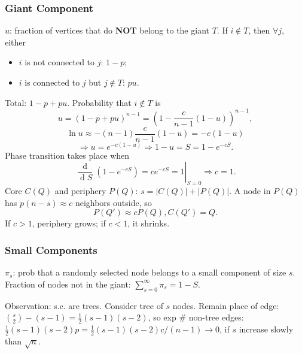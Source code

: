 \documentclass[a4paper,twocolumn,10pt]{article}
\newcommand{\pte}[1]{\left({#1}\right)}
\newcommand{\op}{\operatorname}
\newcommand{\dd}{\op{d}}
\begin{document}
	\subsubsection{Giant Component}
		$u$: fraction of vertices that do \textbf{NOT} belong to the giant $T$.
		If $i\notin T$, then $\forall j$, either
		\begin{itemize}
			\item $i$ is not connected to $j$: $1-p$;
			\item $i$ is connected to $j$ but $j\notin T$: $pu$.
		\end{itemize}
		Total: $1-p+pu$. Probability that $i\notin T$ is
		\[
			u=(1-p+pu)^{n-1}=\pte{1-\frac{c}{n-1}(1-u)}^{n-1},
		\]
		\[
			\ln u 
			\approx -(n-1) \frac{c}{n-1} (1-u) = -c(1-u)
		\]
		\[
			\Longrightarrow u=e^{-c(1-u)}
			\Longrightarrow 1-u=S=1-e^{-cS}.
		\]
		Phase transition takes place when
		\[
			\left.\frac{\dd}{\dd S} \pte{1-e^{-cS}} = c e^{-cS} = 1 \right|_{S=0}
			\Longrightarrow c=1.
		\]
		Core $C(Q)$ and periphery $P(Q)$: $s=|C(Q)|+|P(Q)|$.
		A node in $P(Q)$ has $p(n-s)\approx c$ neighbors outside, so
		\[
			P(Q') \approx c P(Q), C(Q') = Q.
		\]
		If $c>1$, periphery grows; if $c<1$, it shrinks.
	
	\subsubsection{Small Components}
		$\pi_s$: prob that a randomly selected node belongs to a small component of size $s$.
		Fraction of nodes not in the giant: $\sum_{s=0}^\infty \pi_s = 1-S$.

		Observation: s.c. are trees.
		Consider tree of $s$ nodes.
		Remain place of edge: $\binom s 2 - (s-1) = \frac 1 2 (s-1)(s-2)$,
			so exp $\#$ non-tree edges: $\frac 1 2 (s-1)(s-2) p =
			\frac 1 2 (s-1)(s-2) c / (n-1) \to 0$,
			if $s$ increase slowly than $\sqrt n$.
\end{document}
